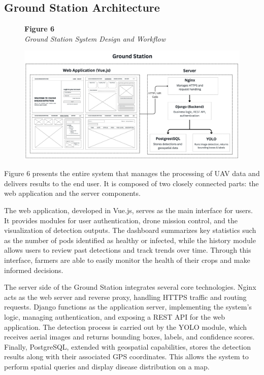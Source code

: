 	\subsection{Ground Station Architecture}
	
	\begin{figure}[H]
		\raggedright
		\textbf{Figure 6} \\ %
		\textit{Ground Station System Design and Workflow} %
		
		\vspace{0.5em}
		\centering
		\includegraphics[width=1\textwidth]{figures/Ground_Station.pdf} %
		
		\vspace{0.5em}
		\raggedright
		
		\label{fig:GroundStation}
	\end{figure}
	
	Figure 6 presents the entire system that manages the processing of UAV data and delivers results to the end user. It is composed of two closely connected parts: the web application and the server components.
	
	The web application, developed in Vue.js, serves as the main interface for users. It provides modules for user authentication, drone mission control, and the visualization of detection outputs. The dashboard summarizes key statistics such as the number of pods identified as healthy or infected, while the history module allows users to review past detections and track trends over time. Through this interface, farmers are able to easily monitor the health of their crops and make informed decisions.
	
	The server side of the Ground Station integrates several core technologies. Nginx acts as the web server and reverse proxy, handling HTTPS traffic and routing requests. Django functions as the application server, implementing the system’s logic, managing authentication, and exposing a REST API for the web application. The detection process is carried out by the YOLO module, which receives aerial images and returns bounding boxes, labels, and confidence scores. Finally, PostgreSQL, extended with geospatial capabilities, stores the detection results along with their associated GPS coordinates. This allows the system to perform spatial queries and display disease distribution on a map.
	
